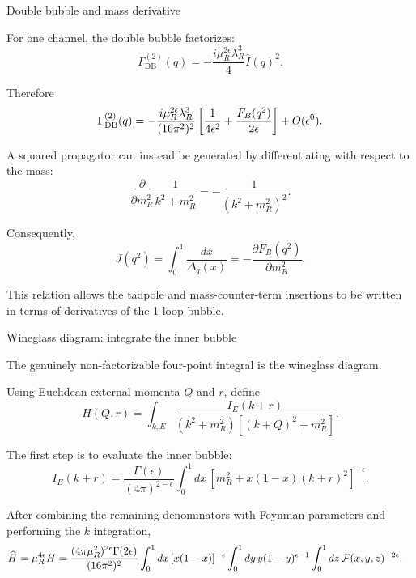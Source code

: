 \documentclass[aspectratio=169,10pt]{beamer}
\begin{document}
\begin{frame}{Double bubble and mass derivative}

For one channel, the double bubble factorizes:
\begin{equation}
\Gamma_{\mathrm{DB}}^{(2)}(q)
=
-\frac{i\mu_R^{2\epsilon}\lambda_R^3}{4}
\widehat I(q)^2.
\end{equation}

Therefore
\begin{equation}
\Gamma_{\mathrm{DB}}^{(2)}(q)
=
-\frac{i\mu_R^{2\epsilon}\lambda_R^3}{(16\pi^2)^2}
\left[
\frac1{4\bar\epsilon^2}
+
\frac{F_B(q^2)}{2\bar\epsilon}
\right]
+
O(\epsilon^0).
\end{equation}

A squared propagator can instead be generated by differentiating
with respect to the mass:
\begin{equation}
\frac{\partial}{\partial m_R^2}
\frac1{k^2+m_R^2}
=
-\frac1{(k^2+m_R^2)^2}.
\end{equation}

Consequently,
\begin{equation}
J(q^2)
=
\int_0^1
\frac{dx}{\Delta_q(x)}
=
-\frac{\partial F_B(q^2)}
{\partial m_R^2}.
\end{equation}

This relation allows the tadpole and mass-counter-term insertions
to be written in terms of derivatives of the 1-loop bubble.

\end{frame}


\begin{frame}{Wineglass diagram: integrate the inner bubble}

The genuinely non-factorizable four-point integral is the
wineglass diagram.

Using Euclidean external momenta $Q$ and $r$, define
\begin{equation}
H(Q,r)
=
\int_{k,E}
\frac{I_E(k+r)}
{(k^2+m_R^2)[(k+Q)^2+m_R^2]}.
\end{equation}

The first step is to evaluate the inner bubble:
\begin{equation}
I_E(k+r)
=
\frac{\Gamma(\epsilon)}
{(4\pi)^{2-\epsilon}}
\int_0^1dx\,
\left[
m_R^2+x(1-x)(k+r)^2
\right]^{-\epsilon}.
\end{equation}

After combining the remaining denominators with Feynman parameters
and performing the $k$ integration,
\begin{align}
\widehat H
&=
\mu_R^{4\epsilon}H =
\frac{(4\pi\mu_R^2)^{2\epsilon}
\Gamma(2\epsilon)}
{(16\pi^2)^2}
\int_0^1dx\,[x(1-x)]^{-\epsilon}
\int_0^1dy\,
y(1-y)^{\epsilon-1}
\int_0^1dz\,
\mathcal F(x,y,z)^{-2\epsilon}.
\end{align}


\end{frame}
\end{document}
